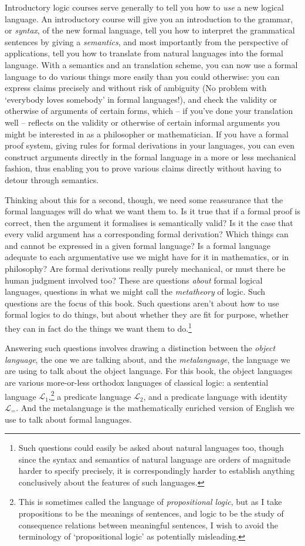 \documentclass[openany,leqno,10pt]{book}
\theoremstyle{break}
\theoremstyle{definition}
\theoremstyle{remark}
\newcommand{\lone}{\ensuremath{\mathcal{L}_{1}}}
\newcommand{\ltwo}{\ensuremath{\mathcal{L}_{2}}}
\newcommand{\lequ}{\ensuremath{\mathcal{L}_{=}}}
\begin{document}
Introductory logic courses serve generally to tell you how to \emph{use} a new logical language. An introductory course will give you an introduction to the grammar, or \emph{syntax}, of the new formal language, tell you how to interpret the grammatical sentences by giving a \emph{semantics}, and most importantly from the perspective of applications, tell you how to translate from natural languages into the formal language. With a semantics and an translation scheme, you can now use a formal language to do various things more easily than you could otherwise: you can express claims precisely and without risk of ambiguity (No problem with `everybody loves somebody' in formal languages!), and check the validity or otherwise of arguments of certain forms, which – if you've done your translation well – reflects on the validity or otherwise of certain informal arguments you might be interested in as a philosopher or mathematician. If you have a formal proof system, giving rules for formal derivations in your languages, you can even construct arguments directly in the formal language in a more or less mechanical fashion, thus enabling you to prove various claims directly without having to detour through semantics.

Thinking about this for a second, though, we need some reassurance that the formal languages will do what we want them to. Is it true that if a formal proof is correct, then the argument it formalises is semantically valid? Is it the case that every valid argument has a corresponding formal derivation? Which things can and cannot be expressed in a given formal language? Is a formal language adequate to each argumentative use we might have for it in mathematics, or in philosophy? Are formal derivations really purely mechanical, or must there be human judgment involved too? These are questions \emph{about} formal logical languages, questions in what we might call the \emph{metatheory} of logic. Such questions are the focus of this book. Such questions aren't about how to use formal logics to do things, but about whether they are fit for purpose, whether they can in fact do the things we want them to do.\footnote{Such questions could easily be asked about natural languages too, though since the syntax and semantics of natural language are orders of magnitude harder to specify precisely, it is correspondingly harder to establish anything conclusively about the features of such languages.}

Answering such questions involves drawing a distinction between the \emph{object language}, the one we are talking about, and the \emph{metalanguage}, the language we are using to talk about the object language. For this book, the object languages are various more-or-less orthodox languages of classical logic: a sentential language \lone,\footnote{This is sometimes called the language of \emph{propositional logic}, but as I take propositions to be the meanings of sentences, and logic to be the study of consequence relations between meaningful sentences, I wish to avoid the terminology of `propositional logic' as potentially misleading.} a predicate language \ltwo, and a predicate language with identity \lequ. And the metalanguage is the mathematically enriched version of English we use to talk about formal languages. 
\end{document}
